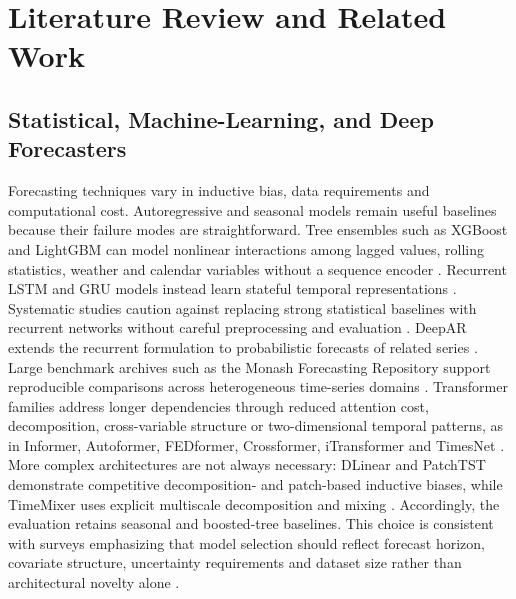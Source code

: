 \documentclass{ieeeaccess}
\begin{document}
\section{Literature Review and Related Work}

\subsection{Statistical, Machine-Learning, and Deep Forecasters}
Forecasting techniques vary in inductive bias, data requirements and computational cost. Autoregressive and seasonal models remain useful baselines because their failure modes are straightforward. Tree ensembles such as XGBoost and LightGBM can model nonlinear interactions among lagged values, rolling statistics, weather and calendar variables without a sequence encoder \cite{chen2016xgboost,ke2017lightgbm}. Recurrent LSTM and GRU models instead learn stateful temporal representations \cite{hochreiter1997lstm,cho2014gru}. Systematic studies caution against replacing strong statistical baselines with recurrent networks without careful preprocessing and evaluation \cite{hewamalage2021rnn}. DeepAR extends the recurrent formulation to probabilistic forecasts of related series \cite{salinas2020deepar}. Large benchmark archives such as the Monash Forecasting Repository support reproducible comparisons across heterogeneous time-series domains \cite{godahewa2021monash}. Transformer families address longer dependencies through reduced attention cost, decomposition, cross-variable structure or two-dimensional temporal patterns, as in Informer, Autoformer, FEDformer, Crossformer, iTransformer and TimesNet \cite{zhou2021informer,wu2021autoformer,zhou2022fedformer,zhang2023crossformer,liu2024itransformer,wu2023timesnet}. More complex architectures are not always necessary: DLinear and PatchTST demonstrate competitive decomposition- and patch-based inductive biases, while TimeMixer uses explicit multiscale decomposition and mixing \cite{zeng2023dlinear,nie2023patchtst,wang2024timemixer}. Accordingly, the evaluation retains seasonal and boosted-tree baselines. This choice is consistent with surveys emphasizing that model selection should reflect forecast horizon, covariate structure, uncertainty requirements and dataset size rather than architectural novelty alone \cite{lim2021survey,benidis2023deepforecasting}.
\end{document}
